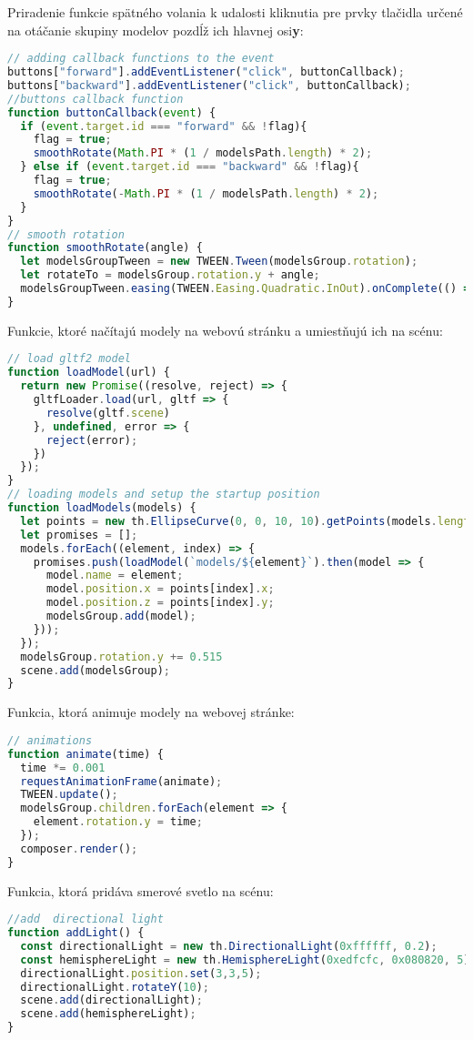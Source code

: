        Priradenie funkcie spätného volania k udalosti kliknutia pre prvky tlačidla určené na otáčanie skupiny modelov pozdĺž ich hlavnej osi\textbf{y}:
\begin{lstlisting}[language=javascript]
// adding callback functions to the event
buttons["forward"].addEventListener("click", buttonCallback);
buttons["backward"].addEventListener("click", buttonCallback);
//buttons callback function
function buttonCallback(event) {
  if (event.target.id === "forward" && !flag){
    flag = true;
    smoothRotate(Math.PI * (1 / modelsPath.length) * 2);
  } else if (event.target.id === "backward" && !flag){
    flag = true;
    smoothRotate(-Math.PI * (1 / modelsPath.length) * 2);
  }
}
// smooth rotation
function smoothRotate(angle) {
  let modelsGroupTween = new TWEEN.Tween(modelsGroup.rotation);
  let rotateTo = modelsGroup.rotation.y + angle;
  modelsGroupTween.easing(TWEEN.Easing.Quadratic.InOut).onComplete(() => {flag = false}).to({ y: rotateTo }, 1000).start();
}
\end{lstlisting}
        Funkcie, ktoré načítajú modely na webovú stránku a umiestňujú ich na scénu:
\begin{lstlisting}[language=javascript]
// load gltf2 model
function loadModel(url) {
  return new Promise((resolve, reject) => {
    gltfLoader.load(url, gltf => {
      resolve(gltf.scene)
    }, undefined, error => {
      reject(error);
    })
  });
}
// loading models and setup the startup position
function loadModels(models) {
  let points = new th.EllipseCurve(0, 0, 10, 10).getPoints(models.length);
  let promises = [];
  models.forEach((element, index) => {
    promises.push(loadModel(`models/${element}`).then(model => {
      model.name = element;
      model.position.x = points[index].x;
      model.position.z = points[index].y;
      modelsGroup.add(model);
    }));
  });
  modelsGroup.rotation.y += 0.515
  scene.add(modelsGroup);
}
\end{lstlisting}
        Funkcia, ktorá animuje modely na webovej stránke:
\begin{lstlisting}[language=javascript]
// animations
function animate(time) {
  time *= 0.001
  requestAnimationFrame(animate);
  TWEEN.update();
  modelsGroup.children.forEach(element => {
    element.rotation.y = time;
  });
  composer.render();
}
\end{lstlisting}
        Funkcia, ktorá pridáva smerové svetlo na scénu:
\begin{lstlisting}[language=javascript]
//add  directional light
function addLight() {
  const directionalLight = new th.DirectionalLight(0xffffff, 0.2);
  const hemisphereLight = new th.HemisphereLight(0xedfcfc, 0x080820, 5);
  directionalLight.position.set(3,3,5);
  directionalLight.rotateY(10);
  scene.add(directionalLight);
  scene.add(hemisphereLight);
}
\end{lstlisting}
